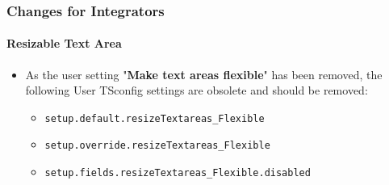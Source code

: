 %

\begin{frame}[fragile]
	\frametitle{Changes for Integrators}
	\framesubtitle{Resizable Text Area}

	\begin{itemize}
		\item As the user setting "\textbf{Make text areas flexible}" has been removed,
			the following User TSconfig settings are obsolete and should be removed:

			\begin{itemize}
				\item \texttt{setup.default.resizeTextareas\_Flexible}
				\item \texttt{setup.override.resizeTextareas\_Flexible}
				\item \texttt{setup.fields.resizeTextareas\_Flexible.disabled}
			\end{itemize}

	\end{itemize}
\end{frame}


